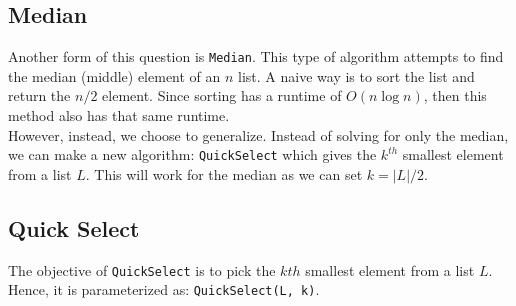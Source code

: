 \documentclass[14pt]{extarticle}
\begin{document}
    \begin{algorithm}[H]

    \end{algorithm}

    \subsection{Median}
    Another form of this question is \texttt{Median}. This type of algorithm
    attempts to find the median (middle) element of an $n$ list. A naive
    way is to sort the list and return the $n / 2$ element. Since sorting
    has a runtime of $O(n\log n)$, then this method also has that same runtime.
    \\

    However, instead, we choose to generalize. Instead of solving for only the
    median, we can make a new algorithm: \texttt{QuickSelect} which gives the
    $k^{th}$ smallest element from a list $L$. This will work for the median
    as we can set $k = |L| / 2$.\\

    \subsection{Quick Select}
    The objective of \texttt{QuickSelect} is to pick the $kth$ smallest element
    from a list $L$. Hence, it is parameterized as: \texttt{QuickSelect(L, k)}.\\
\end{document}
